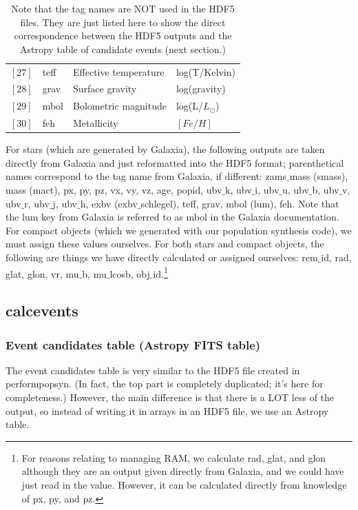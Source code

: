 \documentclass{scrartcl}
\def\tus{\textunderscore}
\begin{document}
\begin{table}[h]
\begin{tabular}{ l | l | p{6.5cm} | l }
    $[27]$ & teff & Effective temperature & log(T/Kelvin) \\
    $[28]$ & grav & Surface gravity & log(gravity) \\
    $[29]$ & mbol & Bolometric magnitude & log(L/$L_\odot$) \\
    $[30]$ & feh & Metallicity & $[Fe/H]$ \\
\end{tabular}
\caption{ Note that the tag names are NOT used in the HDF5 files. 
They are just listed here to show the direct correspondence between the HDF5 outputs and the Astropy table of candidate events (next section.) }
\end{table}

For stars (which are generated by Galaxia), the following outputs are taken directly from Galaxia and just reformatted into the HDF5 format; parenthetical names correspond to the tag name from Galaxia, if different: zams$\_$mass (smass), mass (mact), px, py, pz, vx, vy, vz, age, popid, ubv$\_$k, ubv$\_$i, ubv$\_$u, ubv$\_$b, ubv$\_$v, ubv$\_$r, ubv$\_$j, ubv$\_$h, exbv (exbv$\_$schlegel), teff, grav, mbol (lum), feh. Note that the lum key from Galaxia is referred to as mbol in the Galaxia documentation.
For compact objects (which we generated with our population synthesis code), we must assign these values ourselves. 
For both stars and compact objects, the following are things we have directly calculated or assigned ourselves: rem$\_$id, rad, glat, glon, vr, mu$\_$b, mu$\_$lcosb, obj$\_$id.\footnote{For reasons relating to managing RAM, we calculate rad, glat, and glon although they are an output given directly from Galaxia, and we could have just read in the value. 
However, it can be calculated directly from knowledge of px, py, and pz.}

\newpage

\subsection{calc\tus events}

\subsubsection{Event candidates table (Astropy FITS table)}

The event candidates table is very similar to the HDF5 file created in perform\tus pop\tus syn.
(In fact, the top part is completely duplicated; it's here for completeness.) 
However, the main difference is that there is a LOT less of the output, so instead of writing it in arrays in an HDF5 file, we use an Astropy table.
\end{document}
